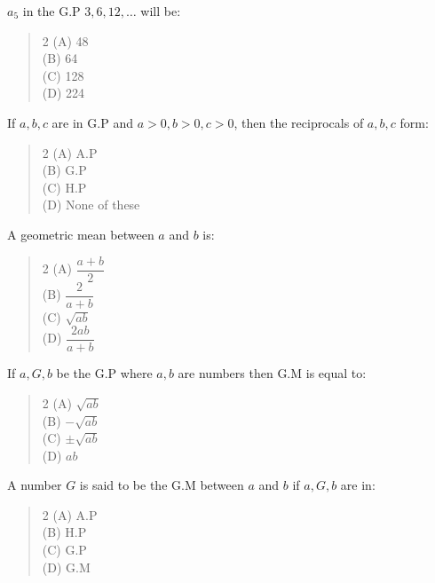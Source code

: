 \documentclass[11pt,a4paper]{article}
\begin{document}
\begin{mcqlist}
\item $a_5$ in the G.P $3,6,12,\ldots$ will be:
\begin{quote}\begin{multicols}{2}
\noindent (A) 48 \\
(B) 64 \\
(C) 128 \\
(D) 224
\end{multicols}\end{quote}

\item If $a,b,c$ are in G.P and $a>0,b>0,c>0$, then the reciprocals of $a,b,c$ form:
\begin{quote}\begin{multicols}{2}
\noindent (A) A.P \\
(B) G.P \\
(C) H.P \\
(D) None of these
\end{multicols}\end{quote}

\item A geometric mean between $a$ and $b$ is:
\begin{quote}\begin{multicols}{2}
\noindent (A) $\dfrac{a+b}{2}$ \\
(B) $\dfrac{2}{a+b}$ \\
(C) $\sqrt{ab}$ \\
(D) $\dfrac{2ab}{a+b}$
\end{multicols}\end{quote}

\item If $a,G,b$ be the G.P where $a,b$ are numbers then G.M is equal to:
\begin{quote}\begin{multicols}{2}
\noindent (A) $\sqrt{ab}$ \\
(B) $-\sqrt{ab}$ \\
(C) $\pm\sqrt{ab}$ \\
(D) $ab$
\end{multicols}\end{quote}

\item A number $G$ is said to be the G.M between $a$ and $b$ if $a,G,b$ are in:
\begin{quote}\begin{multicols}{2}
\noindent (A) A.P \\
(B) H.P \\
(C) G.P \\
(D) G.M
\end{multicols}\end{quote}


\end{mcqlist}
\end{document}
